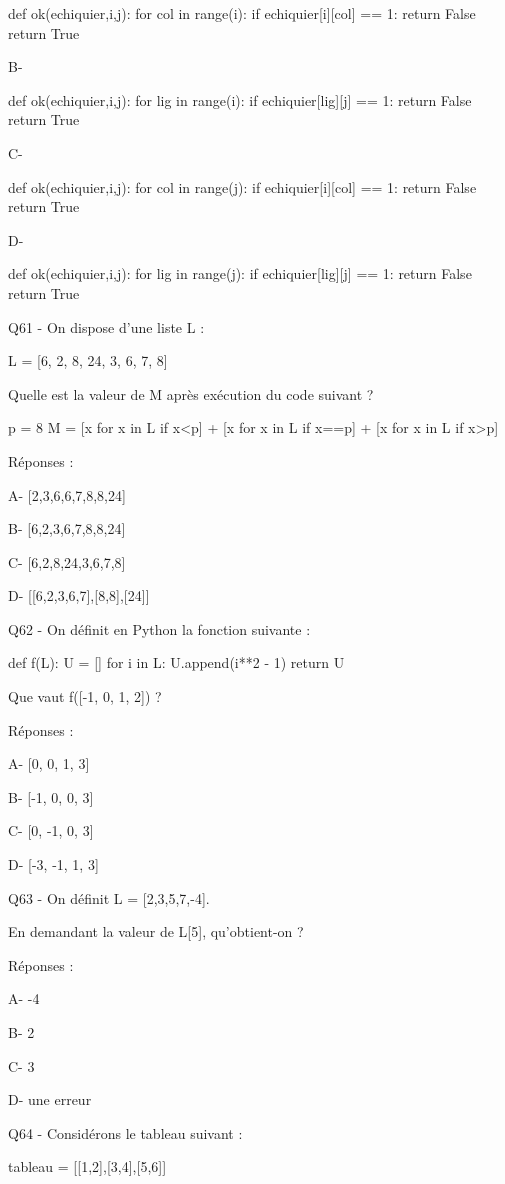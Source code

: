 \documentclass[
]{book}
\begin{document}
def ok(echiquier,i,j):
for col in range(i):
if echiquier{[}i{]}{[}col{]} == 1:
return False
return True

B-

def ok(echiquier,i,j):
for lig in range(i):
if echiquier{[}lig{]}{[}j{]} == 1:
return False
return True

C-

def ok(echiquier,i,j):
for col in range(j):
if echiquier{[}i{]}{[}col{]} == 1:
return False
return True

D-

def ok(echiquier,i,j):
for lig in range(j):
if echiquier{[}lig{]}{[}j{]} == 1:
return False
return True

Q61 - On dispose d'une liste L :

L = {[}6, 2, 8, 24, 3, 6, 7, 8{]}

Quelle est la valeur de M après exécution du code suivant ?

p = 8
M = {[}x for x in L if x\textless p{]} + {[}x for x in L if x==p{]} + {[}x for x in L if x\textgreater p{]}

Réponses :

A- {[}2,3,6,6,7,8,8,24{]}

B- {[}6,2,3,6,7,8,8,24{]}

C- {[}6,2,8,24,3,6,7,8{]}

D- {[}{[}6,2,3,6,7{]},{[}8,8{]},{[}24{]}{]}

Q62 - On définit en Python la fonction suivante :

def f(L):
U = {[}{]}
for i in L:
U.append(i**2 - 1)
return U

Que vaut f({[}-1, 0, 1, 2{]}) ?

Réponses :

A- {[}0, 0, 1, 3{]}

B- {[}-1, 0, 0, 3{]}

C- {[}0, -1, 0, 3{]}

D- {[}-3, -1, 1, 3{]}

Q63 - On définit L = {[}2,3,5,7,-4{]}.

En demandant la valeur de L{[}5{]}, qu'obtient-on ?

Réponses :

A- -4

B- 2

C- 3

D- une erreur

Q64 - Considérons le tableau suivant :

tableau = {[}{[}1,2{]},{[}3,4{]},{[}5,6{]}{]}
\end{document}
